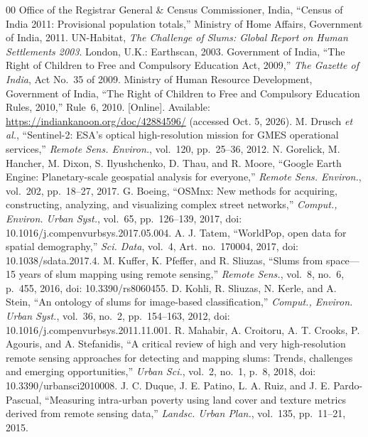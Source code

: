 \documentclass[conference]{IEEEtran}
\begin{document}
\begin{thebibliography}{00}
 Office of the Registrar General \& Census Commissioner, India, ``Census of India 2011: Provisional population totals,'' Ministry of Home Affairs, Government of India, 2011.
 UN-Habitat, \textit{The Challenge of Slums: Global Report on Human Settlements 2003}. London, U.K.: Earthscan, 2003.
 Government of India, ``The Right of Children to Free and Compulsory Education Act, 2009,'' \textit{The Gazette of India}, Act No.~35 of 2009.
 Ministry of Human Resource Development, Government of India, ``The Right of Children to Free and Compulsory Education Rules, 2010,'' Rule~6, 2010. [Online]. Available: \url{https://indiankanoon.org/doc/42884596/} (accessed Oct. 5, 2026).
 M. Drusch \textit{et al.}, ``Sentinel-2: ESA's optical high-resolution mission for GMES operational services,'' \textit{Remote Sens. Environ.}, vol.~120, pp.~25--36, 2012.
 N. Gorelick, M. Hancher, M. Dixon, S. Ilyushchenko, D. Thau, and R. Moore, ``Google Earth Engine: Planetary-scale geospatial analysis for everyone,'' \textit{Remote Sens. Environ.}, vol.~202, pp.~18--27, 2017.
 G. Boeing, ``OSMnx: New methods for acquiring, constructing, analyzing, and visualizing complex street networks,'' \textit{Comput., Environ. Urban Syst.}, vol.~65, pp.~126--139, 2017, doi: 10.1016/j.compenvurbsys.2017.05.004.
 A. J. Tatem, ``WorldPop, open data for spatial demography,'' \textit{Sci. Data}, vol.~4, Art.~no.~170004, 2017, doi: 10.1038/sdata.2017.4.
 M. Kuffer, K. Pfeffer, and R. Sliuzas, ``Slums from space---15 years of slum mapping using remote sensing,'' \textit{Remote Sens.}, vol.~8, no.~6, p.~455, 2016, doi: 10.3390/rs8060455.
 D. Kohli, R. Sliuzas, N. Kerle, and A. Stein, ``An ontology of slums for image-based classification,'' \textit{Comput., Environ. Urban Syst.}, vol.~36, no.~2, pp.~154--163, 2012, doi: 10.1016/j.compenvurbsys.2011.11.001.
 R. Mahabir, A. Croitoru, A. T. Crooks, P. Agouris, and A. Stefanidis, ``A critical review of high and very high-resolution remote sensing approaches for detecting and mapping slums: Trends, challenges and emerging opportunities,'' \textit{Urban Sci.}, vol.~2, no.~1, p.~8, 2018, doi: 10.3390/urbansci2010008.
 J. C. Duque, J. E. Patino, L. A. Ruiz, and J. E. Pardo-Pascual, ``Measuring intra-urban poverty using land cover and texture metrics derived from remote sensing data,'' \textit{Landsc. Urban Plan.}, vol.~135, pp.~11--21, 2015.

\end{thebibliography}
\end{document}
